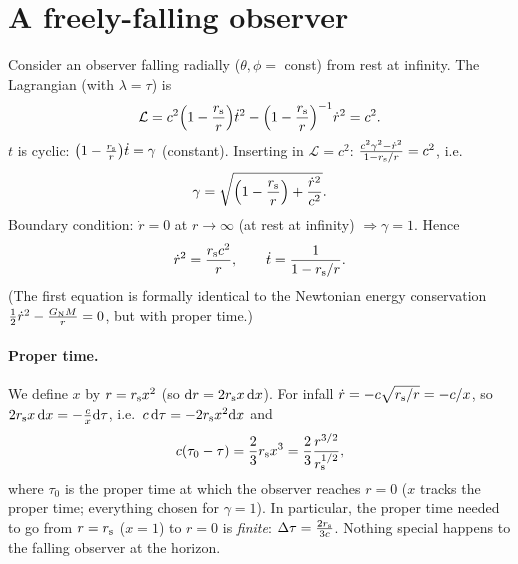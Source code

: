 \section{A freely-falling observer}

Consider an observer falling radially ($\theta,\phi=$ const) from rest at infinity. The Lagrangian (with $\lambda=\tau$) is
\[
  \mathcal L=c^2\Big(1-\frac{r_{\mathrm s}} r\Big)\dot t^2-\Big(1-\frac{r_{\mathrm s}} r\Big)^{-1}\dot r^2=c^2 .
\]
$t$ is cyclic: $\big(1-\frac{r_{\mathrm s}} r\big)\dot t=\gamma$ (constant). Inserting in $\mathcal L=c^2$: $\frac{c^2\gamma^2-\dot r^2}{1-r_{\mathrm s}/r}=c^2$, i.e.
\[
  \gamma=\sqrt{\Big(1-\frac{r_{\mathrm s}}{r}\Big)+\frac{\dot r^2}{c^2}} .
\]
Boundary condition: $\dot r=0$ at $r\to\infty$ (at rest at infinity) $\Rightarrow\gamma=1$. Hence
\begin{equation}
  \dot r^2=\frac{r_{\mathrm s} c^2}{r},\qquad\dot t=\frac{1}{1-r_{\mathrm s}/r}.
\end{equation}
(The first equation is formally identical to the Newtonian energy conservation $\frac12\dot r^2-\frac{G_{\mathrm N} M}{r}=0$, but with proper time.)

\paragraph{Proper time.} We define $x$ by $r=r_{\mathrm s} x^2$ (so $\mathrm{d} r=2r_{\mathrm s} x\,\mathrm{d} x$). For infall $\dot r=-c\sqrt{r_{\mathrm s}/r}=-c/x$, so $2r_{\mathrm s} x\,\mathrm{d} x=-\frac cx\mathrm{d}\tau$, i.e.\ $c\,\mathrm{d}\tau=-2r_{\mathrm s} x^2\mathrm{d} x$ and
\begin{equation}
  c(\tau_0-\tau)=\frac23r_{\mathrm s} x^3=\frac23\frac{r^{3/2}}{r_{\mathrm s}^{1/2}},
\end{equation}
where $\tau_0$ is the proper time at which the observer reaches $r=0$ ($x$ tracks the proper time; everything chosen for $\gamma=1$). In particular, the proper time needed to go from $r=r_{\mathrm s}$ ($x=1$) to $r=0$ is \emph{finite}: $\Delta\tau=\frac{2r_{\mathrm s}}{3c}$. Nothing special happens to the falling observer at the horizon.

